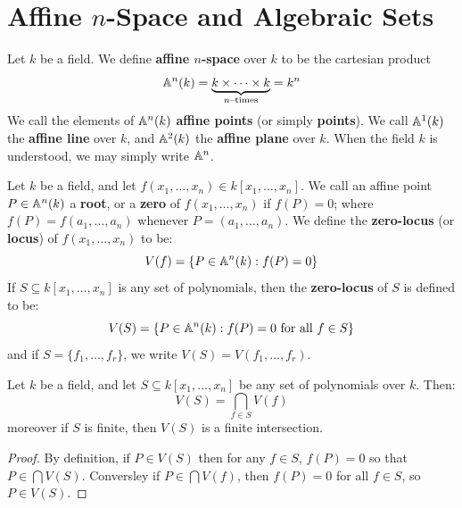\section{Affine $n$-Space and Algebraic Sets}\label{section_10.2}

\begin{definition}
  Let $k$ be a field. We define \textbf{affine $n$-space} over $k$ to
  be the cartesian product
  \begin{equation*}
    \mathbb{A}^n(k)=\underbrace{k \times \dots \times k}_{n\text{--times}}
    = k^n
  \end{equation*}
  We call the elements of $\mathbb{A}^n(k)$ \textbf{affine points} (or simply
  \textbf{points}). We call $\mathbb{A}^1(k)$ the \textbf{affine line} over
  $k$, and $\mathbb{A}^2(k)$ the \textbf{affine plane} over $k$. When the
  field $k$ is understood, we may simply write $\mathbb{A}^n$.
\end{definition}

\begin{definition}
  Let $k$ be a field, and let $f(x_1, \dots, x_n) \in k[x_1, \dots,
  x_n]$. We call an affine point $P \in \mathbb{A}^n(k)$ a \textbf{root}, or a
  \textbf{zero} of $f(x_1, \dots, x_n)$ if $f(P)=0$; where
  $f(P)=f(a_1, \dots, a_n)$ whenever $P=(a_1, \dots, a_n)$. We define
  the \textbf{zero-locus} (or \textbf{locus}) of $f(x_1, \dots, x_n)$
  to be:
  \begin{equation*}
    V(f)=\{P \in \mathbb{A}^n(k) : f(P)=0\}
  \end{equation*}
  If $S \subseteq k[x_1, \dots, x_n]$ is any set of polynomials, then
  the \textbf{zero-locus} of $S$ is defined to be:
  \begin{equation*}
    V(S)=\{ P \in \mathbb{A}^n(k) : f(P)=0 \text{ for all } f \in S \}
  \end{equation*}
  and if $S=\{f_1, \dots, f_r\}$, we write $V(S)=V(f_1, \dots, f_r)$.
\end{definition}

\begin{proposition}\label{proposition_10.1.1}
  Let $k$ be a field, and let $S \subseteq k[x_1, \dots, x_n]$ be any
  set of polynomials over $k$. Then:
  \begin{equation*}
    V(S)=\bigcap_{f \in S}{V(f)}
  \end{equation*}
  moreover if $S$ is finite, then $V(S)$ is a finite intersection.
\end{proposition}
\begin{proof}
  By definition, if $P \in V(S)$ then for any $f \in S$, $f(P)=0$ so
  that $P \in \bigcap{V(S)}$. Conversley if $P \in \bigcap{V(f)}$,
  then $f(P)=0$ for all $f \in S$, so $P \in V(S)$.
\end{proof}

